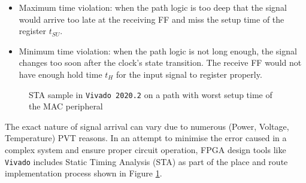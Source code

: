 \documentclass[a4paper]{report}
\newcommand{\code}{\texttt}
\begin{document}
\begin{itemize}
    \item Maximum time violation: when the path logic is too deep that the signal would arrive too late at the receiving FF and miss the setup time of the register $t_{SU}$.
    \item Minimum time violation: when the path logic is not long enough, the signal changes too soon after the clock's state transition. The receive FF would not have enough hold time $t_{H}$ for the input signal to register properly.
\end{itemize}

\begin{figure}[h!]
  \caption{STA sample in \code{Vivado 2020.2} on a path with worst setup time of the MAC peripheral}
  \label{fig:sta-in-action}
\end{figure}

The exact nature of signal arrival can vary due to numerous (Power, Voltage, Temperature) PVT reasons. In an attempt to minimise the error caused in a complex system and ensure proper circuit operation, FPGA design tools like \code{Vivado} includes Static Timing Analysis (STA) as part of the place and route implementation process shown in Figure \ref{fig:sta-in-action}.
\end{document}
